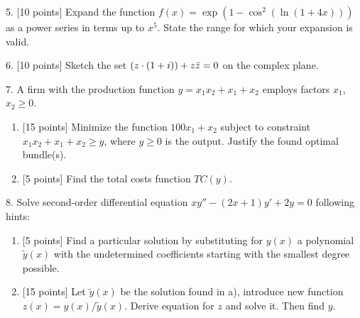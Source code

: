 \documentclass[12pt,a4paper]{article}
\let\Re\relax
\DeclareMathOperator{\Re}{Re}
\begin{document}
\newpage
{}

5. {[10 points]} Expand the function $f(x) = \exp(1 - \cos^2 (\ln(1 + 4x)))$ as a power series in terms up to $x^5$. 
  State the range for which your expansion is valid.

 \newpage 



6. {[10 points]} Sketch the set $\Re(z\cdot (1+i))+z\bar z =0$ on the complex plane.


\newpage
{}

	7. A firm with the production function $y=x_1x_2+x_1+x_2$ employs factors $x_1$, $x_2 \geq 0$.
	  \begin{enumerate}[label=\alph*)]
	    \item {[15 points]} Minimize the function $100x_1+x_2$  subject to constraint  $x_1x_2+x_1+x_2 \geq y$, where  $y\geq 0$ is the output. 
	      Justify the found optimal bundle(s).
	    \item {[5 points]} Find the total costs function  $TC(y)$.
	  \end{enumerate}


	  \newpage
{}
	
	8. Solve second-order differential equation $xy''-(2x+1)y'+2y=0$ following hints: 
	\begin{enumerate}[label=\alph*)]
	    \item {[5 points]} Find a particular solution by substituting for $y(x)$ a polynomial $\tilde y(x)$ with 
	      the undetermined coefficients starting with the smallest degree possible.
	    \item {[15 points]} Let $\tilde y(x)$  be the solution found in a),  introduce new function $z(x)=y(x)/\tilde y(x)$. 
	      Derive equation for $z$ and solve it. Then find $y$.
	  \end{enumerate}
      
\end{document}
